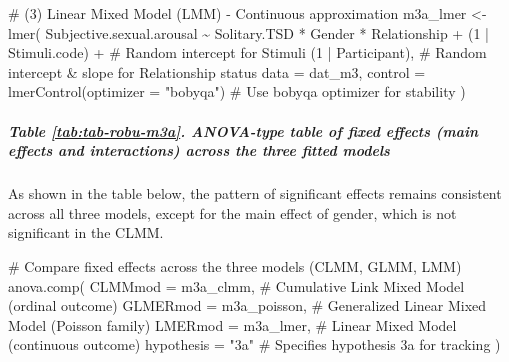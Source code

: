 \documentclass[
  bookmarksnumbered]{article}
\newenvironment{Shaded}{\begin{snugshade}}{\end{snugshade}}
\newcommand{\AttributeTok}[1]{\textcolor[rgb]{0.80,0.80,0.80}{#1}}
\newcommand{\CommentTok}[1]{\textcolor[rgb]{0.50,0.62,0.50}{#1}}
\newcommand{\DecValTok}[1]{\textcolor[rgb]{0.86,0.86,0.80}{#1}}
\newcommand{\FunctionTok}[1]{\textcolor[rgb]{0.94,0.94,0.56}{#1}}
\newcommand{\NormalTok}[1]{\textcolor[rgb]{0.80,0.80,0.80}{#1}}
\newcommand{\OtherTok}[1]{\textcolor[rgb]{0.94,0.94,0.56}{#1}}
\newcommand{\SpecialCharTok}[1]{\textcolor[rgb]{0.86,0.64,0.64}{#1}}
\newcommand{\StringTok}[1]{\textcolor[rgb]{0.80,0.58,0.58}{#1}}
\begin{document}
\begin{Shaded}
\begin{Highlighting}[]
\CommentTok{\# (3) Linear Mixed Model (LMM) {-} Continuous approximation}
\NormalTok{m3a\_lmer }\OtherTok{\textless{}{-}} \FunctionTok{lmer}\NormalTok{(}
\NormalTok{  Subjective.sexual.arousal }\SpecialCharTok{\textasciitilde{}}\NormalTok{ Solitary.TSD }\SpecialCharTok{*}\NormalTok{ Gender }\SpecialCharTok{*}\NormalTok{ Relationship }\SpecialCharTok{+}
\NormalTok{    (}\DecValTok{1} \SpecialCharTok{|}\NormalTok{ Stimuli.code) }\SpecialCharTok{+} \CommentTok{\# Random intercept for Stimuli}
\NormalTok{    (}\DecValTok{1} \SpecialCharTok{|}\NormalTok{ Participant), }\CommentTok{\# Random intercept \& slope for Relationship status}
  \AttributeTok{data =}\NormalTok{ dat\_m3,}
  \AttributeTok{control =} \FunctionTok{lmerControl}\NormalTok{(}\AttributeTok{optimizer =} \StringTok{"bobyqa"}\NormalTok{) }\CommentTok{\# Use \textquotesingle{}bobyqa\textquotesingle{} optimizer for stability}
\NormalTok{)}
\end{Highlighting}
\end{Shaded}

\subparagraph{Table \ref{tab:tab-robu-m3a}. ANOVA-type table of fixed effects (main effects and interactions) across the three fitted models}\label{table-reftabtab-robu-m3a.-anova-type-table-of-fixed-effects-main-effects-and-interactions-across-the-three-fitted-models}

As shown in the table below, the pattern of significant effects remains consistent across all three models, except for the main effect of gender, which is not significant in the CLMM.

\begin{Shaded}
\begin{Highlighting}[]
\CommentTok{\# Compare fixed effects across the three models (CLMM, GLMM, LMM)}
\FunctionTok{anova.comp}\NormalTok{(}
  \AttributeTok{CLMMmod =}\NormalTok{ m3a\_clmm, }\CommentTok{\# Cumulative Link Mixed Model (ordinal outcome)}
  \AttributeTok{GLMERmod =}\NormalTok{ m3a\_poisson, }\CommentTok{\# Generalized Linear Mixed Model (Poisson family)}
  \AttributeTok{LMERmod =}\NormalTok{ m3a\_lmer, }\CommentTok{\# Linear Mixed Model (continuous outcome)}
  \AttributeTok{hypothesis =} \StringTok{"3a"} \CommentTok{\# Specifies hypothesis 3a for tracking}
\NormalTok{)}
\end{Highlighting}
\end{Shaded}
\end{document}
